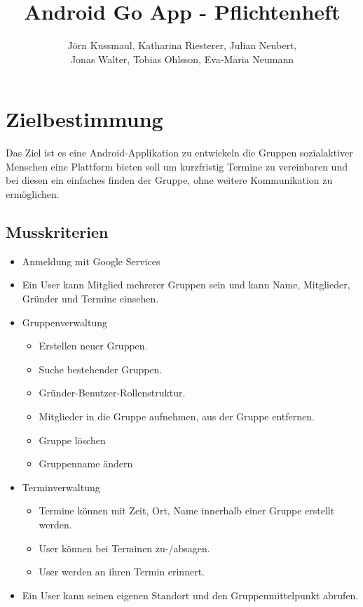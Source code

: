 \documentclass{scrartcl}
\title{Android Go App - Pflichtenheft}
\author{Jörn Kussmaul, Katharina Riesterer, Julian Neubert,\\ Jonas Walter, Tobias Ohlsson, Eva-Maria Neumann}
\begin{document}
		
	

	\maketitle
	\newpage
	
	\tableofcontents
	\newpage
	\section{Zielbestimmung}
	Das Ziel ist es eine Android-Applikation zu entwickeln die Gruppen sozialaktiver Menschen eine Plattform bieten soll um kurzfristig Termine zu vereinbaren und bei diesen ein einfaches finden der Gruppe, ohne weitere Kommunikation zu ermöglichen.
	\subsection{Musskriterien}
	\begin{itemize}
		\item Anmeldung mit Google Services
		\item Ein User kann Mitglied mehrerer Gruppen sein und kann Name, Mitglieder, Gründer und Termine einsehen.
		\item Gruppenverwaltung
		\begin{itemize}
			\item Erstellen neuer Gruppen.
			\item Suche bestehender Gruppen.
			\item Gründer-Benutzer-Rollenstruktur.
			\item Mitglieder in die Gruppe aufnehmen, aus der Gruppe entfernen.
			\item Gruppe löschen
			\item Gruppenname ändern
		\end{itemize}
		\item Terminverwaltung
		\begin{itemize}
			\item Termine können mit Zeit, Ort, Name innerhalb einer Gruppe erstellt werden.
			\item User können bei Terminen zu-/absagen.
			\item User werden an ihren Termin erinnert.
		\end{itemize}
		\item Ein User kann seinen eigenen Standort und den Gruppenmittelpunkt abrufen.	
	\end{itemize}
\end{document}
